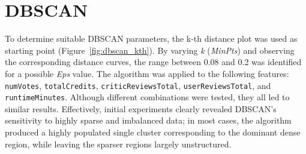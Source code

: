 


\section{DBSCAN}\label{sec:density_based}
To determine suitable DBSCAN parameters, the k-th distance plot was used as starting point (Figure~\ref{fig:dbscan_kth}). 
By varying \textit{k} (\textit{MinPts}) and observing the corresponding distance curves, the range between 0.08 and 0.2 was identified for a possible \textit{Eps} value.
The algorithm was applied to the following features: \texttt{numVotes}, \texttt{totalCredits}, \texttt{criticReviewsTotal}, \texttt{userReviewsTotal}, and \texttt{runtimeMinutes}. 
Although different combinations were tested, they all led to similar results. 
Effectively, initial experiments clearly revealed DBSCAN's sensitivity to highly sparse and imbalanced data; 
in most cases, the algorithm produced a highly populated single cluster corresponding to the dominant dense region, 
while leaving the sparser regions largely unstructured.
